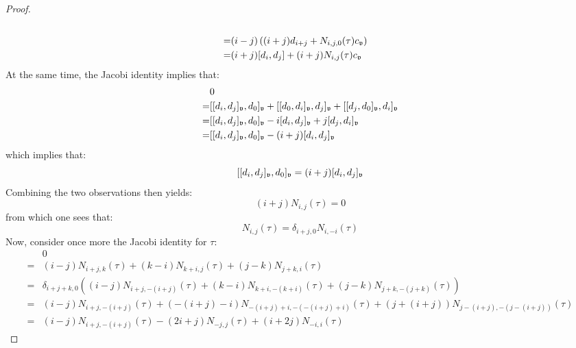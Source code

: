\begin{proof}
$$\begin{aligned}
                        \\
                        = & (i - j) \left( (i + j) d_{i + j} + N_{i, j, 0}(\tau) c_{\frakv} \right)
                        \\
                        = & (i + j) [d_i, d_j] + (i + j) N_{i, j}(\tau) c_{\frakv}
                    \end{aligned}
                $$
            At the same time, the Jacobi identity implies that:
                $$
                    \begin{aligned}
                        & 0
                        \\
                        = & [[d_i, d_j]_{\frakv}, d_0]_{\frakv} + [[d_0, d_i]_{\frakv}, d_j]_{\frakv} + [[d_j, d_0]_{\frakv}, d_i]_{\frakv}
                        \\
                        = & [[d_i, d_j]_{\frakv}, d_0]_{\frakv} - i [d_i, d_j]_{\frakv} + j [d_j, d_i]_{\frakv}
                        \\
                        = & [[d_i, d_j]_{\frakv}, d_0]_{\frakv} - (i + j) [d_i, d_j]_{\frakv}
                    \end{aligned}
                $$
            which implies that:
                $$[[d_i, d_j]_{\frakv}, d_0]_{\frakv} = (i + j) [d_i, d_j]_{\frakv}$$
            Combining the two observations then yields:
                $$(i + j) N_{i, j}(\tau) = 0$$
            from which one sees that:
                $$N_{i, j}(\tau) = \delta_{i + j, 0} N_{i, -i}(\tau)$$
            Now, consider once more the Jacobi identity for $\tau$:
                $$
                    \begin{aligned}
                        & 0
                        \\
                        = & (i - j) N_{i + j, k}(\tau) + (k - i) N_{k + i, j}(\tau) + (j - k) N_{j + k, i}(\tau)
                        \\
                        = & \delta_{i + j + k, 0} \left( (i - j)  N_{i + j, -(i + j)}(\tau) + (k - i) N_{k + i, -(k + i)}(\tau) + (j - k) N_{j + k, -(j + k)}(\tau) \right)
                        \\
                        = & (i - j)  N_{i + j, -(i + j)}(\tau) + (-(i + j) - i) N_{-(i + j) + i, -(-(i + j) + i)}(\tau) + (j + (i + j)) N_{j - (i + j), -(j -(i + j))}(\tau)
                        \\
                        = & (i - j)  N_{i + j, -(i + j)}(\tau) - (2i + j) N_{-j, j}(\tau) + (i + 2j) N_{-i, i}(\tau)

\end{aligned}$$
\end{proof}
